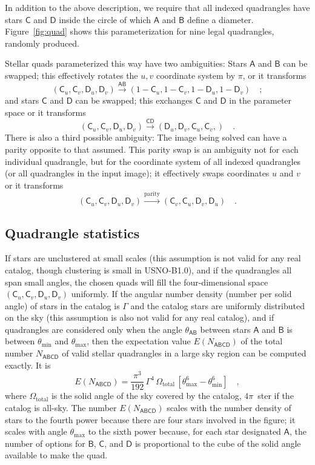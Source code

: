 \documentclass[12pt,preprint]{aastex}
\newcommand{\usnob}{USNO-B1.0}
\newcommand{\starlabel}[1]{\mathsf{#1}}
\newcommand{\AAA}{\starlabel{A}}
\newcommand{\BBB}{\starlabel{B}}
\newcommand{\CCC}{\starlabel{C}}
\newcommand{\DDD}{\starlabel{D}}
\newcommand{\NABCD}{N_{\AAA\BBB\CCC\DDD}}
\newcommand{\ENABCD}{E(\NABCD)}
\newcommand{\thetaAB}{\theta_{\AAA\BBB}}
\newcommand{\thetamin}{\theta_\mathrm{min}}
\newcommand{\thetamax}{\theta_\mathrm{max}}
\begin{document}
In addition to the above description, we require that all indexed
quadrangles have stars $\CCC$ and $\DDD$ inside the circle of which
$\AAA$ and $\BBB$ define a diameter.  Figure~\ref{fig:quad} shows this
parameterization for nine legal quadrangles, randomly produced.

Stellar quads parameterized this way have two ambiguities:  Stars
$\AAA$ and $\BBB$ can be swapped; this effectively rotates the $u,v$
coordinate system by $\pi$, or it transforms
\begin{equation}
(\CCC_u,\CCC_v,\DDD_u,\DDD_v) \stackrel{\AAA\BBB}{\rightarrow}
  (1-\CCC_u,1-\CCC_v,1-\DDD_u,1-\DDD_v) \quad ;
\end{equation}
and stars $\CCC$ and $\DDD$ can be swapped; this exchanges $\CCC$ and
$\DDD$ in the parameter space or it transforms
\begin{equation}
(\CCC_u,\CCC_v,\DDD_u,\DDD_v) \stackrel{\CCC\DDD}{\rightarrow}
  (\DDD_u,\DDD_v,\CCC_u,\CCC_v,) \quad .
\end{equation}
There is also a third possible ambiguity: The image being solved can
have a parity opposite to that assumed.  This parity swap is an
ambiguity not for each individual quadrangle, but for the coordinate
system of all indexed quadrangles (or all quadrangles in the input
image); it effectively swaps coordinates $u$ and $v$ or it transforms
\begin{equation}
(\CCC_u,\CCC_v,\DDD_u,\DDD_v) \stackrel{\mathrm{parity}}{\rightarrow}
  (\CCC_v,\CCC_u,\DDD_v,\DDD_u) \quad .
\end{equation}

\subsection{Quadrangle statistics}

If stars are unclustered at small scales (this assumption is not valid
for any real catalog, though clustering is small in \usnob), and if
the quadrangles all span small angles, the chosen quads will fill the
four-dimensional space $(\CCC_u,\CCC_v,\DDD_u,\DDD_v)$ uniformly.  If
the angular number density (number per solid angle) of stars in the
catalog is $\Gamma$ and the catalog stars are uniformly distributed on
the sky (this assumption is also not valid for any real catalog), and
if quadrangles are considered only when the angle $\thetaAB$ between
stars $\AAA$ and $\BBB$ is between $\thetamin$ and $\thetamax$, then
the expectation value $\ENABCD$ of the total number $\NABCD$ of valid
stellar quadrangles in a large sky region can be computed exactly.  It
is
\begin{equation}
\ENABCD = \frac{\pi^3}{192}\,\Gamma^4\,\Omega_\mathrm{total}\,
  [\thetamax^6-\thetamin^6] \quad ,
\end{equation}
where $\Omega_\mathrm{total}$ is the solid angle of the sky covered by
the catalog, $4\pi$~ster if the catalog is all-sky.  The number
$\ENABCD$ scales with the number density of stars to the fourth power
because there are four stars involved in the figure; it scales with
angle $\thetamax$ to the sixth power because, for each star designated
$\AAA$, the number of options for $\BBB$, $\CCC$, and $\DDD$ is
proportional to the cube of the solid angle available to make the
quad.
\end{document}
